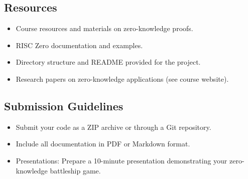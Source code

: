 \documentclass[10pt,a4paper,american]{exam}
\begin{document}
\subsection*{Resources}
\begin{itemize}
	\item Course resources and materials on zero-knowledge proofs.
	\item RISC Zero documentation and examples.
	\item Directory structure and README provided for the project.
	\item Research papers on zero-knowledge applications (see course website).
\end{itemize}

\subsection*{Submission Guidelines}
\begin{itemize}
	\item Submit your code as a ZIP archive or through a Git repository.
	\item Include all documentation in PDF or Markdown format.
	\item Presentations: Prepare a 10-minute presentation demonstrating your zero-knowledge battleship game.
\end{itemize}
\end{document}
